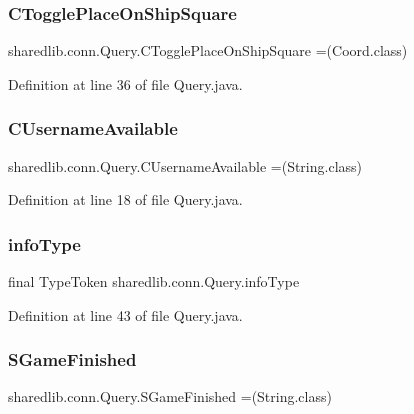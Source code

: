 \subsubsection{\texorpdfstring{C\+Toggle\+Place\+On\+Ship\+Square}{CTogglePlaceOnShipSquare}}
{\footnotesize\ttfamily sharedlib.\+conn.\+Query.\+C\+Toggle\+Place\+On\+Ship\+Square =(Coord.\+class)}



Definition at line 36 of file Query.\+java.

\hypertarget{enumsharedlib_1_1conn_1_1_query_a8766bb4267f59d52ba82acbdb4d0b314}{}\label{enumsharedlib_1_1conn_1_1_query_a8766bb4267f59d52ba82acbdb4d0b314} 
\subsubsection{\texorpdfstring{C\+Username\+Available}{CUsernameAvailable}}
{\footnotesize\ttfamily sharedlib.\+conn.\+Query.\+C\+Username\+Available =(String.\+class)}



Definition at line 18 of file Query.\+java.

\hypertarget{enumsharedlib_1_1conn_1_1_query_aa47f95cd7114e74188a26eca106cdfd6}{}\label{enumsharedlib_1_1conn_1_1_query_aa47f95cd7114e74188a26eca106cdfd6} 
\subsubsection{\texorpdfstring{info\+Type}{infoType}}
{\footnotesize\ttfamily final Type\+Token sharedlib.\+conn.\+Query.\+info\+Type}



Definition at line 43 of file Query.\+java.

\hypertarget{enumsharedlib_1_1conn_1_1_query_a1946b23695285c3144c5241c073eaf2d}{}\label{enumsharedlib_1_1conn_1_1_query_a1946b23695285c3144c5241c073eaf2d} 
\subsubsection{\texorpdfstring{S\+Game\+Finished}{SGameFinished}}
{\footnotesize\ttfamily sharedlib.\+conn.\+Query.\+S\+Game\+Finished =(String.\+class)}



